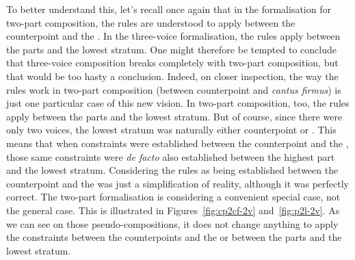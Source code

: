 To better understand this, let's recall once again that in the formalisation for two-part composition, the rules are understood to apply between the counterpoint and the \cf. In the three-voice formalisation, the rules apply between the parts and the lowest stratum. One might therefore be tempted to conclude that three-voice composition breaks completely with two-part composition, but that would be too hasty a conclusion. Indeed, on closer inspection, the way the rules work in two-part composition (between counterpoint and \textit{cantus firmus}) is just one particular case of this new vision. In two-part composition, too, the rules apply between the parts and the lowest stratum. But of course, since there were only two voices, the lowest stratum was naturally either counterpoint or \cf. This means that when constraints were established between the counterpoint and the \cf, those same constraints were \textit{de facto} also established between the highest part and the lowest stratum. Considering the rules as being established between the counterpoint and the \cfs was just a simplification of reality, although it was perfectly correct. The two-part formalisation is considering a convenient special case, not the general case. This is illustrated in Figures~\ref{fig:cp2cf-2v} and~\ref{fig:p2l-2v}. As we can see on those pseudo-compositions, it does not change anything to apply the constraints between the counterpoints and the \cfs or between the parts and the lowest stratum.

